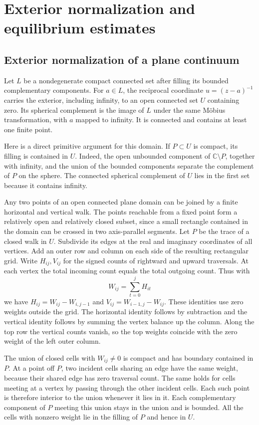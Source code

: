 \documentclass[11pt]{article}
\newcommand{\C}{\mathbb C}
\begin{document}
	
	\appendix
	\section{Exterior normalization and equilibrium estimates}
	\subsection{Exterior normalization of a plane continuum}
	\label{sec:exterior-normalization}
	
	Let \(L\) be a nondegenerate compact connected set after filling
	its bounded complementary components. For \(a\in L\), the reciprocal
	coordinate \(u=(z-a)^{-1}\) carries the exterior, including infinity,
	to an open connected set \(U\) containing zero. Its spherical
	complement is the image of \(L\) under the same M\"obius
	transformation, with \(a\) mapped to infinity. It is connected and
	contains at least one finite point.
	
	Here is a direct primitive argument for this domain. If \(P\subset U\)
	is compact, its filling is contained in \(U\). Indeed, the open
	unbounded component of \(\C\setminus P\), together with infinity, and
	the union of the bounded components separate the complement of \(P\)
	on the sphere. The connected spherical complement of \(U\) lies in
	the first set because it contains infinity.
	
	Any two points of an open connected plane domain can be joined by a
	finite horizontal and vertical walk. The points reachable from a
	fixed point form a relatively open and relatively closed subset,
	since a small rectangle contained in the domain can be crossed in two
	axis-parallel segments. Let \(P\) be the trace of a closed walk in
	\(U\). Subdivide its edges at the real and imaginary coordinates of
	all vertices. Add an outer row and column on each side of the
	resulting rectangular grid. Write \(H_{ij},V_{ij}\) for the signed
	counts of rightward and upward traversals. At each vertex the total
	incoming count equals the total outgoing count. Thus with
	\[
	W_{ij}=\sum_{t=0}^j H_{it}
	\]
	we have \(H_{ij}=W_{ij}-W_{i,j-1}\) and
	\(V_{ij}=W_{i-1,j}-W_{ij}\). These identities use zero weights outside
	the grid. The horizontal identity follows by subtraction and the
	vertical identity follows by summing the vertex balance up the
	column. Along the top row the vertical counts vanish, so the top
	weights coincide with the zero weight of the left outer column.
	
	The union of closed cells with \(W_{ij}\ne0\) is compact and has
	boundary contained in \(P\). At a point off \(P\), two incident
	cells sharing an edge have the same weight, because their shared
	edge has zero traversal count. The same holds for cells meeting at
	a vertex by passing through the other incident cells. Each such
	point is therefore interior to the union whenever it lies in it.
	Each complementary component of \(P\) meeting this union stays in
	the union and is bounded. All the cells with nonzero weight lie in
	the filling of \(P\) and hence in \(U\).
	
\end{document}
